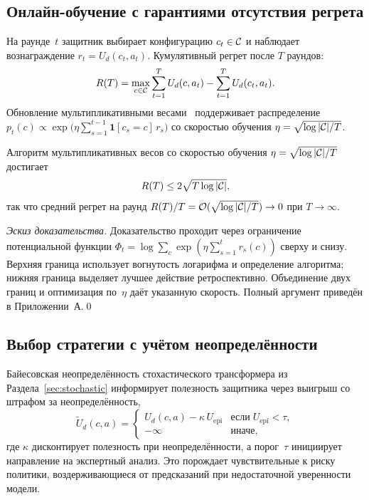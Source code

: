 \subsection{Онлайн-обучение с гарантиями отсутствия регрета}

На раунде~$t$ защитник выбирает конфигурацию $c_t\in\mathcal{C}$ и наблюдает вознаграждение $r_t=U_d(c_t,a_t)$. Кумулятивный регрет после $T$ раундов:
\begin{equation}
R(T)
= \max_{c\in\mathcal{C}}\sum_{t=1}^{T}U_d(c,a_t)
  - \sum_{t=1}^{T}U_d(c_t,a_t).
\label{eq:game_regret}
\end{equation}
Обновление мультипликативными весами~\cite{AroraHK2012,CesaBianchi2006} поддерживает распределение $p_t(c)\propto\exp\!\bigl(\eta\sum_{s=1}^{t-1}\mathbf{1}[c_s{=}c]\,r_s\bigr)$ со скоростью обучения $\eta=\sqrt{\log|\mathcal{C}|/T}$.

\begin{theorem}
\label{thm:regret}
Алгоритм мультипликативных весов со скоростью обучения $\eta=\sqrt{\log|\mathcal{C}|/T}$ достигает
\begin{equation}
R(T)\le 2\sqrt{T\log|\mathcal{C}|},
\label{eq:game_regret_bound}
\end{equation}
так что средний регрет на раунд $R(T)/T=\mathcal{O}(\sqrt{\log|\mathcal{C}|/T})\to 0$ при $T\to\infty$.
\end{theorem}

\noindent\textit{Эскиз доказательства.} Доказательство проходит через ограничение потенциальной функции $\Phi_t=\log\sum_c\exp(\eta\sum_{s=1}^{t}r_s(c))$ сверху и снизу. Верхняя граница использует вогнутость логарифма и определение алгоритма; нижняя граница выделяет лучшее действие ретроспективно. Объединение двух границ и оптимизация по~$\eta$ даёт указанную скорость. Полный аргумент приведён в Приложении~А.\qed

\subsection{Выбор стратегии с учётом неопределённости}

Байесовская неопределённость стохастического трансформера из Раздела~\ref{sec:stochastic} информирует полезность защитника через выигрыш со штрафом за неопределённость,
\begin{equation}
\tilde{U}_d(c,a)
= \begin{cases}
U_d(c,a) - \kappa\,U_{\mathrm{epi}} & \text{если}\;U_{\mathrm{epi}}<\tau,\\
-\infty & \text{иначе},
\end{cases}
\label{eq:game_unc}
\end{equation}
где $\kappa$ дисконтирует полезность при неопределённости, а порог~$\tau$ инициирует направление на экспертный анализ. Это порождает чувствительные к риску политики, воздерживающиеся от предсказаний при недостаточной уверенности модели.

